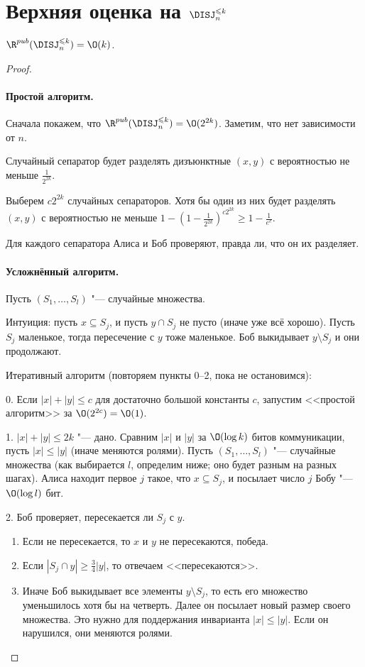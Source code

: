 \section{Верхняя оценка на \texorpdfstring{$\DISJ^{\leqslant k}_n$}{DISJ(n, <=k)}}

\begin{theorem}
$\R^{pub}(\DISJ^{\leqslant k}_n) = \O(k)$.
\end{theorem}

\begin{proof}~
\paragraph{Простой алгоритм.}
Сначала покажем, что $\R^{pub}(\DISJ^{\leqslant k}_n) = \O(2^{2k})$. Заметим, что нет зависимости от $n$.

Случайный сепаратор будет разделять дизъюнктные $(x, y)$ с вероятностью не меньше $\frac{1}{2^{2k}}$.

Выберем $c2^{2k}$ случайных сепараторов. Хотя бы один из них будет разделять $(x, y)$ с вероятностью не меньше $1-(1-\frac{1}{2^{2k}})^{c2^{2k}}\geqslant 1-\frac{1}{e^c}$.

Для каждого сепаратора Алиса и Боб проверяют, правда ли, что он их разделяет.

\paragraph{Усложнённый алгоритм.}
Пусть $(S_1, \ldots, S_{l})$ "--- случайные множества.

Интуиция:
пусть $x\subseteq S_j$, и пусть $y\cap S_j$ не пусто (иначе уже всё хорошо).
Пусть $S_j$ маленькое, тогда пересечение с $y$ тоже маленькое.
Боб выкидывает $y\setminus S_j$ и они продолжают.

Итеративный алгоритм (повторяем пункты 0--2, пока не остановимся):

0. Если $|x|+|y|\leqslant c$ для достаточно большой константы $c$, запустим <<простой алгоритм>> за $\O(2^{2c}) = \O(1)$.

1. $|x|+|y|\leqslant 2k$ "--- дано.
Сравним $|x|$ и $|y|$ за $\O(\log k)$ битов коммуникации, пусть $|x|\leqslant |y|$ (иначе меняются ролями).
Пусть $(S_1, \ldots, S_{l})$ "--- случайные множества (как выбирается $l$, определим ниже; оно будет разным на разных шагах).
Алиса находит первое $j$ такое, что $x\subseteq S_j$, и посылает число $j$ Бобу "--- $\O(\log l)$ бит.

2. Боб проверяет, пересекается ли $S_j$ с $y$.
\begin{enumerate}[---]
    \item Если не пересекается, то $x$ и $y$ не пересекаются, победа.
    \item Если $|S_j\cap y| \geqslant \frac{3}{4}|y|$, то отвечаем <<пересекаются>>.
    \item Иначе Боб выкидывает все элементы $y\setminus S_j$, то есть его множество уменьшилось хотя бы на четверть. Далее он посылает новый размер своего множества. Это нужно для поддержания инварианта $|x|\leqslant |y|$. Если он нарушился, они меняются ролями.
\end{enumerate}



\end{proof}
